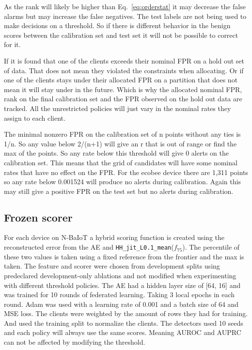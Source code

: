 \documentclass[pdflatex,sn-mathphys-num]{sn-jnl}
\begin{document}
As the rank will likely be higher than Eq.~\ref{eq:orderstat} it may decrease the false alarms but may increase the false negatives. The test labels are not being used to make decisions on a threshold. So if there is different behavior in the benign scores between the calibration set and test set it will not be possible to correct for it.

If it is found that one of the clients exceeds their nominal FPR on a hold out set of data. That does not mean they violated the constraints when allocating. Or if one of the clients stays under their allocated FPR on a partition that does not mean it will stay under in the future. Which is why the allocated nominal FPR, rank on the final calibration set and the FPR observed on the hold out data are tracked. All the unrestricted policies will just vary in the nominal rates they assign to each client.

The minimal nonzero FPR on the calibration set of n points without any ties is 1/n. So any value below 2/(n+1) will give an r that is out of range or find the max of the points. So any rate below this threshold will give 0 alerts on the calibration set. This means that the grid of candidates will have some nominal rates that have no effect on the FPR. For the ecobee device there are 1,311 points so any rate below 0.001524 will produce no alerts during calibration. Again this may still give a positive FPR on the test set but no alerts during calibration.

\subsection{Frozen scorer}
For each device on N-BaIoT a hybrid scoring function is created using the reconstructed error from the AE and \texttt{HH\_jit\_L0.1\_mean}($f_{75}$). The percentile of these two values is taken using a fixed reference from the frontier and the max is taken. The feature and scorer were chosen from development splits using predeclared development-only ablations and not modified when experimenting with different threshold policies. The AE had a hidden layer size of [64, 16] and was trained for 10 rounds of federated learning. Taking 3 local epochs in each round. Adam was used with a learning rate of 0.001 and a batch size of 64 and MSE loss. The clients were weighted by the amount of rows they had for training. And used the training split to normalize the clients. The detectors used 10 seeds and each policy will always use the same scores. Meaning AUROC and AUPRC can not be affected by modifying the threshold.
\end{document}
